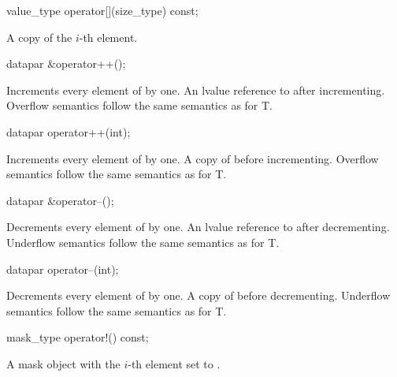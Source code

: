 \begin{itemdecl}
value_type operator[](size_type) const;
\end{itemdecl}
\begin{itemdescr}
  \pnum\returns A copy of the $i$-th element.
\end{itemdescr}

\begin{itemdecl}
datapar &operator++();
\end{itemdecl}
\begin{itemdescr}
  \pnum\effects Increments every element of  by one.
  \pnum\returns An lvalue reference to  after incrementing.
  \pnum\remarks Overflow semantics follow the same semantics as for \type T.
\end{itemdescr}

\begin{itemdecl}
datapar operator++(int);
\end{itemdecl}
\begin{itemdescr}
  \pnum\effects Increments every element of  by one.
  \pnum\returns A copy of  before incrementing.
  \pnum\remarks Overflow semantics follow the same semantics as for \type T.
\end{itemdescr}

\begin{itemdecl}
datapar &operator--();
\end{itemdecl}
\begin{itemdescr}
  \pnum\effects Decrements every element of  by one.
  \pnum\returns An lvalue reference to  after decrementing.
  \pnum\remarks Underflow semantics follow the same semantics as for \type T.
\end{itemdescr}

\begin{itemdecl}
datapar operator--(int);
\end{itemdecl}
\begin{itemdescr}
  \pnum\effects Decrements every element of  by one.
  \pnum\returns A copy of  before decrementing.
  \pnum\remarks Underflow semantics follow the same semantics as for \type T.
\end{itemdescr}

\begin{itemdecl}
mask_type operator!() const;
\end{itemdecl}
\begin{itemdescr}
  \pnum\returns A mask object with the $i$-th element set to  \foralli.
\end{itemdescr}

